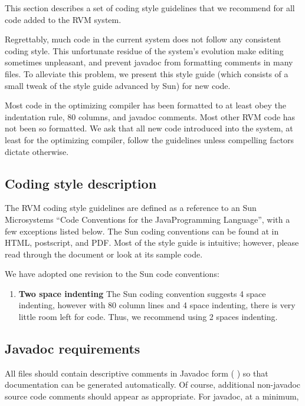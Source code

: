 This section describes a set of coding style guidelines that we
recommend for all code added to the RVM  system.  

Regrettably, much code in the current system does not follow any consistent
coding style.  This unfortunate residue of the system's evolution 
make editing sometimes unpleasant, and prevent javadoc from formatting comments
in
many files.  To alleviate this problem, we present this style guide 
(which consists of a small tweak of the style guide advanced by Sun) 
for new code. 

Most code in the optimizing compiler has been formatted to at least obey 
the indentation rule, 80 columns, and javadoc comments.  Most other RVM code
has not been so formatted. We ask that all new code introduced
into the system, at least for the optimizing compiler, follow the 
guidelines unless compelling factors dictate otherwise.  

\subsection {Coding style description}

The RVM coding style guidelines are defined as a reference to an Sun
Microsystems ``Code Conventions for the Java\trademark Programming Language'',
with a few exceptions listed below.  The Sun coding
conventions can be found at 
\xlink{{\tt \SunCodeConventionURL}} {\SunCodeConventionURL} in HTML,
postscript, and PDF.  Most of the style guide is intuitive; 
however, please read through the document or look at its sample code.

We have adopted one revision to the Sun code conventions:
\begin{enumerate}
\item {\bf Two space indenting} The Sun coding convention suggests 4
space indenting, however with 80 column lines and 4 space indenting,
there is very little room left for code.  Thus, we recommend using 2
spaces indenting.

\end{enumerate}

\subsection {Javadoc requirements}

All files should contain descriptive comments
in Javadoc form (
\xlink{{\tt \JavadocURL}} {\JavadocURL}
) so
that documentation can be generated automatically.  Of course,
additional non-javadoc source code comments should appear as
appropriate.
For javadoc, at a minimum,

